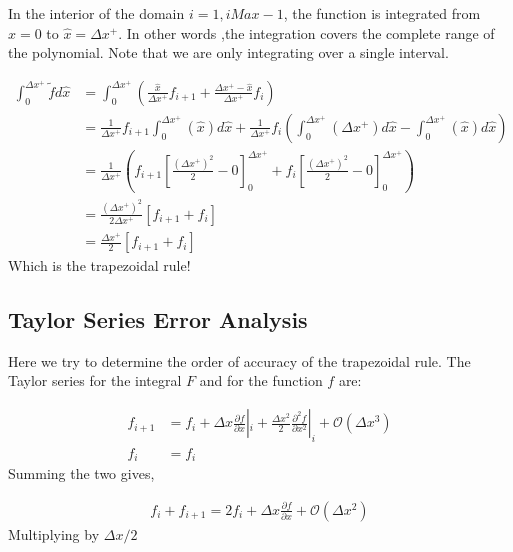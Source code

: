 In the interior of the domain $i = 1, iMax - 1$, the function is integrated 
from $\hat{x} = 0$ to $\hat{x} = \Delta x^+$. In other words ,the integration 
covers the complete range of the polynomial. Note that we are only integrating
over a single interval.

\begin{align*}
    \int_0^{\Delta x^+} \widetilde{f} d\hat{x}&=
    \int_0^{\Delta x^+}
    \left( 
        \frac{\hat{x}}{\Delta x^+}f_{i+1} +
        \frac{\Delta x^+ - \hat{x}}{\Delta x^+}f_i
\right) \\ &= 
\frac{1}{\Delta x^+}f_{i+1}
\int_{0}^{\Delta x^+} 
\left(\hat{x}  \right) d\hat{x}
+
\frac{1}{\Delta x^+}
f_{i}
\left(
    \int_{0}^{\Delta x^+} 
    \left( \Delta x^+  \right) d\hat{x}
    -
    \int_{0}^{\Delta x^+} 
    \left( 
        \hat{x}
    \right) d\hat{x}
\right)\\
           &=\frac{1}{\Delta x^+}
           \left( 
               f_{i+1}\left[ 
                   \frac{\left( \Delta x^+ \right)^2}{
                   2} - 0
               \right]_0^{\Delta x^+}
               +
               f_i
               \left[ 
\frac{\left( \Delta x^+ \right)^2}{
                   2} - 0
               \right]_0^{\Delta x^+}
           \right) \\ &=
           \frac{\left( \Delta x^+ \right)^2}{2 \Delta x^+}
           \left[ f_{i+1} +f_i\right] \\
           &= 
           \frac{\Delta x^+}{2 }
           \left[ f_{i+1} +f_i\right] 
\end{align*}
Which is the trapezoidal rule!
\subsection{Taylor Series Error Analysis}

Here we try to determine the order of accuracy of the trapezoidal rule. 
The Taylor series for the integral $F$ and for the function $f$ are:

\begin{align*}
    f_{i+1} &= f_i +
    \Delta x \frac{\partial f}{\partial x}|_i +
    \frac{\Delta x^2}{2} \frac{\partial^2 f}{\partial x^2}|_i +
    \mathcal{O}\left( \Delta x^3 \right) \\
    f_i &= f_i
\end{align*}
Summing the two gives,

\begin{align*}
f_i + f_{i+1} = 2 f_i  + \Delta x \frac{\partial f}{\partial x } +
\mathcal{O}\left( \Delta x^2 \right) 
\end{align*}
Multiplying by $\Delta x /2  $

